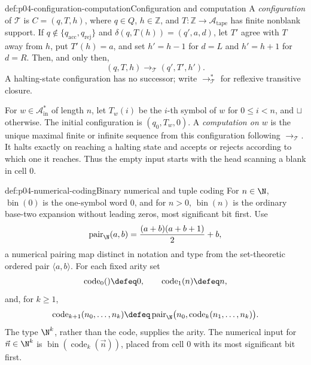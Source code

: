 \begin{hbdefinition}{def:p04-configuration-computation}{Configuration and computation}
A \emph{configuration} of \(\mathcal T\) is \(C=(q,T,h)\), where
\(q\in Q\), \(h\in\mathbb Z\), and
\(T:\mathbb Z\to\mathcal A_{\mathrm{tape}}\) has finite nonblank support.  If
\(q\notin\{q_{\mathrm{acc}},q_{\mathrm{rej}}\}\) and
\(\delta(q,T(h))=(q',a,d)\), let \(T'\) agree with \(T\) away from
\(h\), put \(T'(h)=a\), and set \(h'=h-1\) for \(d=L\) and
\(h'=h+1\) for \(d=R\).  Then, and only then,
\[
  (q,T,h)\longrightarrow_{\mathcal T}(q',T',h').
\]
A halting-state configuration has no successor; write
\(\longrightarrow_{\mathcal T}^{*}\) for reflexive transitive closure.

For \(w\in\mathcal A_{\mathrm{in}}^*\) of length \(n\), let \(T_w(i)\)
be the \(i\)-th symbol of \(w\) for \(0\le i<n\), and \(\sqcup\)
otherwise.  The initial configuration is \((q_0,T_w,0)\).  A
\emph{computation on \(w\)} is the unique maximal finite or infinite
sequence from this configuration following \(\longrightarrow_{\mathcal T}\).
It halts exactly on reaching a halting state and accepts or rejects according
to which one it reaches.  Thus the empty input starts with the head scanning
a blank in cell \(0\).
\end{hbdefinition}

\begin{hbconvention}{def:p04-numerical-coding}{Binary numerical and tuple coding}
For \(n\in\N\), \(\operatorname{bin}(0)\) is the one-symbol word \(0\),
and for \(n>0\), \(\operatorname{bin}(n)\) is the ordinary base-two
expansion without leading zeros, most significant bit first.  Use
\[
  \operatorname{pair}_{\N}(a,b)
  =\frac{(a+b)(a+b+1)}2+b,
\]
a numerical pairing map distinct in notation and type from the set-theoretic
ordered pair \(\langle a,b\rangle\).  For each fixed arity set
\[
 \operatorname{code}_0()\defeq0,
 \qquad \operatorname{code}_1(n)\defeq n,
\]
and, for \(k\geq1\),
\[
 \operatorname{code}_{k+1}(n_0,\ldots,n_k)
 \defeq
 \operatorname{pair}_{\N}\bigl(n_0,
   \operatorname{code}_k(n_1,\ldots,n_k)\bigr).
\]
The type \(\N^k\), rather than the code, supplies the arity.  The numerical
input for \(\vec n\in\N^k\) is
\(\operatorname{bin}(\operatorname{code}_k(\vec n))\), placed from cell
\(0\) with its most significant bit first.
\end{hbconvention}

